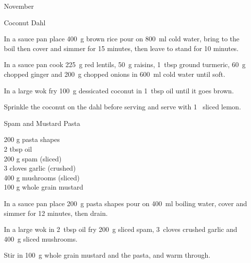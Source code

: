 \begin{menu}{November}
\begin{recipe}{2}{Coconut Dahl}
    \begin{instructions}
    \item 
    In a
    sauce pan
    place
    400~g  brown rice
    pour on
    800~ml  cold water,
    bring to the boil then cover and simmer for 15 minutes,
    then leave to stand for 10 minutes.
  \item 
        In a sauce pan cook
        225~g  red lentils,
        50~g  raisins,
        1~tbsp  ground turmeric,
        60~g chopped ginger
        and
        200~g chopped onions
        in
        600~ml  cold water
        until soft.
      \item 
        In a large wok fry
        100~g  dessicated coconut
        in
        1~tbsp  oil
        until it goes brown.
      \item 
        Sprinkle the coconut on the dahl
        before serving
        and
        serve with
        1~ sliced lemon.
      
    \end{instructions}
    \end{recipe}%
  
    \begin{recipe}{1}{Spam and Mustard Pasta}%
		\begin{ingredients}
		200 g pasta shapes  \\
	2 tbsp oil  \\
	200 g spam (sliced) \\
	3 cloves garlic (crushed) \\
	400 g mushrooms (sliced) \\
	100 g whole grain mustard  \\
	
		\end{ingredients}
	
	
    \begin{instructions}
    \item 
    In a
    sauce pan
    place
    200~g  pasta shapes
    pour on
    400~ml  boiling water,
    cover and simmer for 12 minutes, then drain.
  \item 
        In a large wok in
        2~tbsp  oil
        fry
        200~g sliced spam,
        3~cloves crushed garlic
        and
        400~g sliced mushrooms.
      \item 
        Stir in
        100~g  whole grain mustard
        and the pasta,
        and warm through.
      
    \end{instructions}
    \end{recipe}%
  
    \clearpage
    \end{menu}
	
